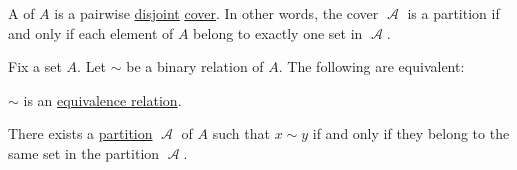 \begin{definition}\label{def:set_partition}
  A  of \( A \) is a pairwise \hyperref[def:subset]{disjoint} \hyperref[def:set_cover]{cover}. In other words, the cover \( \mscrA \) is a partition if and only if each element of \( A \) belong to exactly one set in \( \mscrA \).
\end{definition}

\begin{proposition}\label{thm:equivalence_partition}
  Fix a set \( A \). Let \( {\sim} \) be a binary relation of \( A \). The following are equivalent:
  \begin{thmenum}
     \( {\sim} \) is an \hyperref[def:equivalence_relation]{equivalence relation}.

     There exists a \hyperref[def:set_partition]{partition} \( \mscrA \) of \( A \) such that \( x \sim y \) if and only if they belong to the same set in the partition \( \mscrA \).
  \end{thmenum}
\end{proposition}
